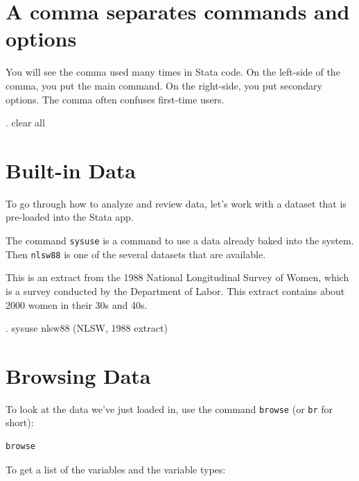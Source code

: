 \documentclass[]{article}
\begin{document}
\section{A comma separates commands and
options}\label{a-comma-separates-commands-and-options}

You will see the comma used many times in Stata code. On the left-side
of the comma, you put the main command. On the right-side, you put
secondary options. The comma often confuses first-time users.

\begin{stlog}
. clear all
{\smallskip}
\end{stlog}

\section{Built-in Data}\label{built-in-data}

To go through how to analyze and review data, let's work with a dataset
that is pre-loaded into the Stata app.

The command \texttt{sysuse} is a command to use a data already baked
into the system. Then \texttt{nlsw88} is one of the several datasets
that are available.

This is an extract from the 1988 National Longitudinal Survey of Women,
which is a survey conducted by the Department of Labor. This extract
contains about 2000 women in their 30s and 40s.

\begin{stlog}
. sysuse nlsw88
(NLSW, 1988 extract)
{\smallskip}
\end{stlog}

\section{Browsing Data}\label{browsing-data}

To look at the data we've just loaded in, use the command
\texttt{browse} (or \texttt{br} for short):

\begin{verbatim}
browse
\end{verbatim}

To get a list of the variables and the variable types:
\end{document}
